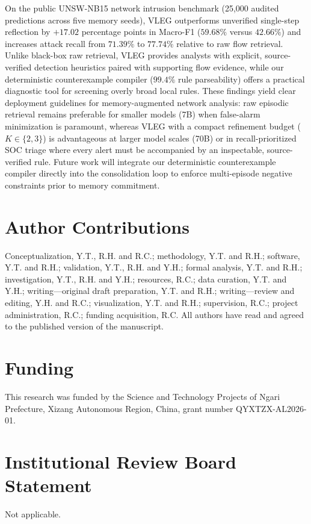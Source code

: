 \documentclass[journal]{IEEEtran}
\theoremstyle{definition}
\theoremstyle{remark}
\begin{document}
On the public UNSW-NB15 network intrusion benchmark (25,000 audited predictions across five memory seeds), VLEG outperforms unverified single-step reflection by $+17.02$ percentage points in Macro-F1 ($59.68\%$ versus $42.66\%$) and increases attack recall from $71.39\%$ to $77.74\%$ relative to raw flow retrieval. Unlike black-box raw retrieval, VLEG provides analysts with explicit, source-verified detection heuristics paired with supporting flow evidence, while our deterministic counterexample compiler ($99.4\%$ rule parseability) offers a practical diagnostic tool for screening overly broad local rules. These findings yield clear deployment guidelines for memory-augmented network analysis: raw episodic retrieval remains preferable for smaller models (7B) when false-alarm minimization is paramount, whereas VLEG with a compact refinement budget ($K\in\{2,3\}$) is advantageous at larger model scales (70B) or in recall-prioritized SOC triage where every alert must be accompanied by an inspectable, source-verified rule. Future work will integrate our deterministic counterexample compiler directly into the consolidation loop to enforce multi-episode negative constraints prior to memory commitment.


\section*{Author Contributions}
Conceptualization, Y.T., R.H. and R.C.; methodology, Y.T. and R.H.; software, Y.T. and R.H.; validation, Y.T., R.H. and Y.H.; formal analysis, Y.T. and R.H.; investigation, Y.T., R.H. and Y.H.; resources, R.C.; data curation, Y.T. and Y.H.; writing---original draft preparation, Y.T. and R.H.; writing---review and editing, Y.H. and R.C.; visualization, Y.T. and R.H.; supervision, R.C.; project administration, R.C.; funding acquisition, R.C. All authors have read and agreed to the published version of the manuscript.

\section*{Funding}
This research was funded by the Science and Technology Projects of Ngari Prefecture, Xizang Autonomous Region, China, grant number QYXTZX-AL2026-01.

\section*{Institutional Review Board Statement}
Not applicable.
\end{document}

